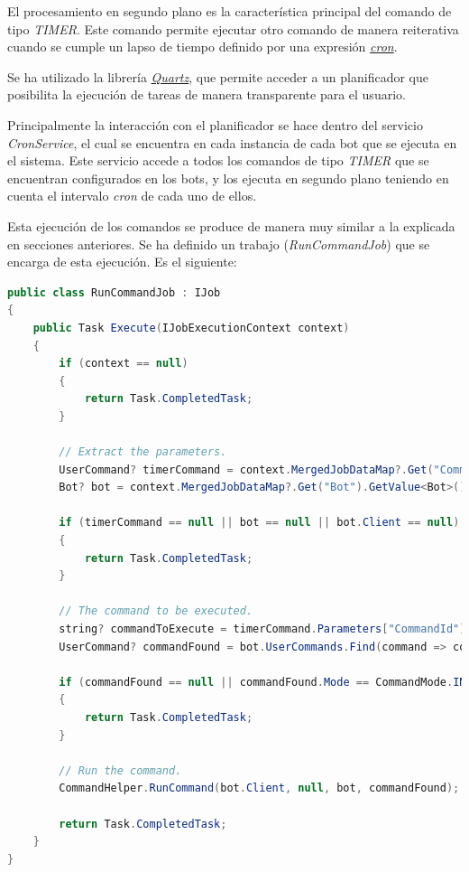 El procesamiento en segundo plano es la característica principal del comando de tipo \textit{TIMER}. Este comando permite ejecutar otro comando de manera reiterativa cuando se cumple un lapso de tiempo definido por una expresión \href{https://docs.oracle.com/cd/E12058_01/doc/doc.1014/e12030/cron_expressions.htm}{\textit{cron}}.

Se ha utilizado la librería \href{https://www.quartz-scheduler.net/}{\textit{Quartz}}, que permite acceder a un planificador que posibilita la ejecución de tareas de manera transparente para el usuario.

Principalmente la interacción con el planificador se hace dentro del servicio \textit{CronService}, el cual se encuentra en cada instancia de cada bot que se ejecuta en el sistema. Este servicio accede a todos los comandos de tipo \textit{TIMER} que se encuentran configurados en los bots, y los ejecuta en segundo plano teniendo en cuenta el intervalo \textit{cron} de cada uno de ellos.

Esta ejecución de los comandos se produce de manera muy similar a la explicada en secciones anteriores. Se ha definido un trabajo (\textit{RunCommandJob}) que se encarga de esta ejecución. Es el siguiente:

\begin{lstlisting}[language=java]
public class RunCommandJob : IJob
{
    public Task Execute(IJobExecutionContext context)
    {
        if (context == null)
        {
            return Task.CompletedTask;
        }

        // Extract the parameters.
        UserCommand? timerCommand = context.MergedJobDataMap?.Get("Command").GetValue<UserCommand>();
        Bot? bot = context.MergedJobDataMap?.Get("Bot").GetValue<Bot>();

        if (timerCommand == null || bot == null || bot.Client == null)
        {
            return Task.CompletedTask;
        }

        // The command to be executed.
        string? commandToExecute = timerCommand.Parameters["CommandId"].GetValue<string>();
        UserCommand? commandFound = bot.UserCommands.Find(command => command.Id == Guid.Parse(commandToExecute ?? ""));

        if (commandFound == null || commandFound.Mode == CommandMode.INLINE || commandFound.Mode == CommandMode.HEADLESS)
        {
            return Task.CompletedTask;
        }

        // Run the command.
        CommandHelper.RunCommand(bot.Client, null, bot, commandFound);

        return Task.CompletedTask;
    }
}
\end{lstlisting}


